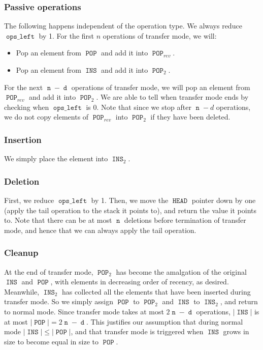 \documentclass[12.5pt]{scrartcl}
\DeclareMathOperator{\INS}{\mathtt{INS}}
\DeclareMathOperator{\POP}{\mathtt{POP}}
\DeclareMathOperator{\HEAD}{\mathtt{HEAD}}
\DeclareMathOperator{\opsleft}{\mathtt{ops\_left}}
\DeclareMathOperator{\n}{\mathtt{n}}
\DeclareMathOperator{\dd}{\mathtt{d}}
\begin{document}
\subsubsection{Passive operations} The following happens independent of the operation type. We always reduce $\opsleft$ by 1. For the first $n$ operations of transfer mode, we will:
\begin{itemize}
	\item Pop an element from $\POP$ and add it into $\POP_{rev}$.
	\item Pop an element from $\INS$ and add it into $\POP_2$.
\end{itemize}
For the next $\n - \dd$ operations of transfer mode, we will pop an element from $\POP_{rev}$ and add it into $\POP_2$. We are able to tell when transfer mode ends by checking when $\opsleft$ is 0. Note that since we stop after $\n-d$ operations, we do not copy elements of $\POP_{rev}$ into $\POP_2$ if they have been deleted.     

\subsubsection{Insertion} We simply place the element into $\INS_2$.

\subsubsection{Deletion} First, we reduce $\opsleft$ by 1. Then, we move the $\HEAD$ pointer down by one (apply the tail operation to the stack it points to), and return the value it points to. Note that there can be at most $\n$ deletions before termination of transfer mode, and hence that we can always apply the tail operation.

\subsubsection{Cleanup} At the end of transfer mode, $\POP_2$ has become the amalgation of the original $\INS$ and $\POP$, with elements in decreasing order of recency, as desired. Meanwhile, $\INS_2$ has collected all the elements that have been inserted during transfer mode. So we simply assign $\POP$ to $\POP_2$ and $\INS$ to $\INS_2$, and return to normal mode. Since transfer mode takes at most $2\n - \dd$ operations, $|\INS|$ is at most $|\POP| = 2\n - \dd$. This justifies our assumption that during normal mode $|\INS| \leq |\POP|$, and that transfer mode is triggered when $\INS$ grows in size to become equal in size to $\POP$. 

\nocite{hood}

\printbibliography
\end{document}
